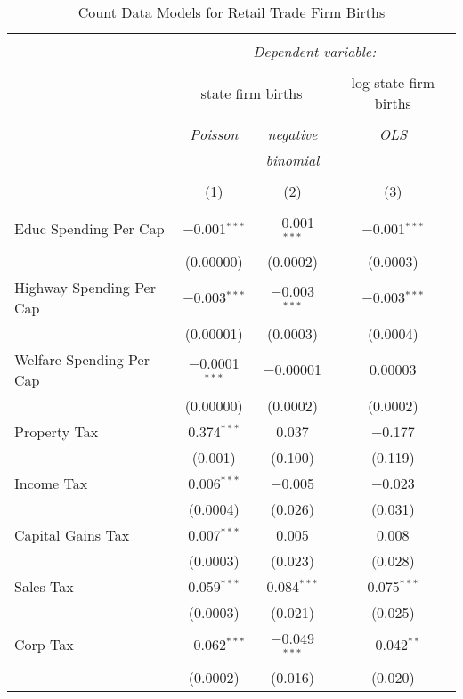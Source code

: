 
\begin{table}[!htbp] \centering 
  \caption{Count Data Models for Retail Trade Firm Births} 
  \label{} 
\begin{tabular}{@{\extracolsep{5pt}}lccc} 
\\[-1.8ex]\hline 
\hline \\[-1.8ex] 
 & \multicolumn{3}{c}{\textit{Dependent variable:}} \\ 
\cline{2-4} 
\\[-1.8ex] & \multicolumn{2}{c}{state firm births} & log state firm births \\ 
\\[-1.8ex] & \textit{Poisson} & \textit{negative} & \textit{OLS} \\ 
 & \textit{} & \textit{binomial} & \textit{} \\ 
\\[-1.8ex] & (1) & (2) & (3)\\ 
\hline \\[-1.8ex] 
 Educ Spending Per Cap & $-$0.001$^{***}$ & $-$0.001$^{***}$ & $-$0.001$^{***}$ \\ 
  & (0.00000) & (0.0002) & (0.0003) \\ 
  Highway Spending Per Cap  & $-$0.003$^{***}$ & $-$0.003$^{***}$ & $-$0.003$^{***}$ \\ 
  & (0.00001) & (0.0003) & (0.0004) \\ 
  Welfare Spending Per Cap  & $-$0.0001$^{***}$ & $-$0.00001 & 0.00003 \\ 
  & (0.00000) & (0.0002) & (0.0002) \\ 
  Property Tax & 0.374$^{***}$ & 0.037 & $-$0.177 \\ 
  & (0.001) & (0.100) & (0.119) \\ 
  Income Tax & 0.006$^{***}$ & $-$0.005 & $-$0.023 \\ 
  & (0.0004) & (0.026) & (0.031) \\ 
  Capital Gains Tax & 0.007$^{***}$ & 0.005 & 0.008 \\ 
  & (0.0003) & (0.023) & (0.028) \\ 
  Sales Tax & 0.059$^{***}$ & 0.084$^{***}$ & 0.075$^{***}$ \\ 
  & (0.0003) & (0.021) & (0.025) \\ 
  Corp Tax & $-$0.062$^{***}$ & $-$0.049$^{***}$ & $-$0.042$^{**}$ \\ 
  & (0.0002) & (0.016) & (0.020) \\ 

\end{tabular}
\end{table}
